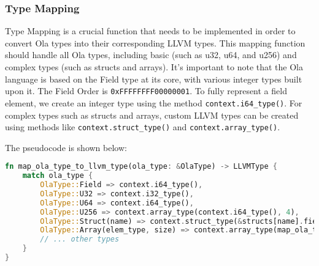 \subsubsection*{Type Mapping}

Type Mapping is a crucial function that needs to be implemented in order to convert Ola types into their corresponding LLVM types. This mapping function should handle all Ola types, including basic (such as u32, u64, and u256) and complex types (such as structs and arrays). It's important to note that the Ola language is based on the Field type at its core, with various integer types built upon it. The Field Order is \texttt{0xFFFFFFFF00000001}. To fully represent a field element, we create an integer type using the method \texttt{context.i64\_type()}. For complex types such as structs and arrays, custom LLVM types can be created using methods like \texttt{context.struct\_type()} and \texttt{context.array\_type()}.

The pseudocode is shown below:

\begin{lstlisting}[language=Rust]
  fn map_ola_type_to_llvm_type(ola_type: &OlaType) -> LLVMType {
    match ola_type {
        OlaType::Field => context.i64_type(),
        OlaType::U32 => context.i32_type(),
        OlaType::U64 => context.i64_type(),
        OlaType::U256 => context.array_type(context.i64_type(), 4),
        OlaType::Struct(name) => context.struct_type(&structs[name].fields, false),
        OlaType::Array(elem_type, size) => context.array_type(map_ola_type_to_llvm_type(elem_type), *size),
        // ... other types
    }
}
\end{lstlisting}